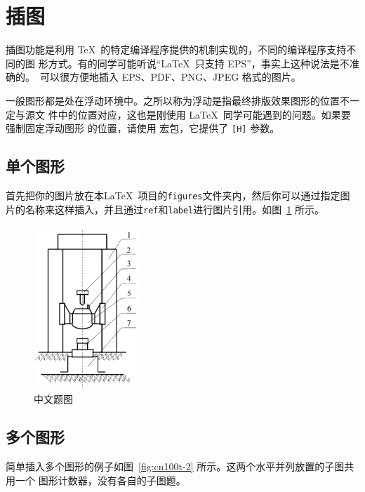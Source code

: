 \section{插图}
插图功能是利用 \TeX\ 的特定编译程序提供的机制实现的，不同的编译程序支持不同的图
形方式。有的同学可能听说“\LaTeX\ 只支持 EPS”，事实上这种说法是不准确的。\XeTeX\
可以很方便地插入 EPS、PDF、PNG、JPEG 格式的图片。

一般图形都是处在浮动环境中。之所以称为浮动是指最终排版效果图形的位置不一定与源文
件中的位置对应，这也是刚使用 \LaTeX\ 同学可能遇到的问题。如果要强制固定浮动图形
的位置，请使用  宏包，它提供了 \texttt{[H]} 参数。

\subsection{单个图形}
首先把你的图片放在本\LaTeX\ 项目的\texttt{figures}文件夹内，然后你可以通过指定图片的名称来这样插入，并且通过\texttt{ref}和\texttt{label}进行图片引用。如图~\ref{fig:cn100t} 所示。

\begin{figure}[h]
  	\centering
  	\includegraphics[width=4cm]{figures/cn100t.png}
	\caption{中文题图}
    \label{fig:cn100t}
\end{figure}

\subsection{多个图形}
简单插入多个图形的例子如图~\ref{fig:cn100t-2} 所示。这两个水平并列放置的子图共用一个
图形计数器，没有各自的子图题。

